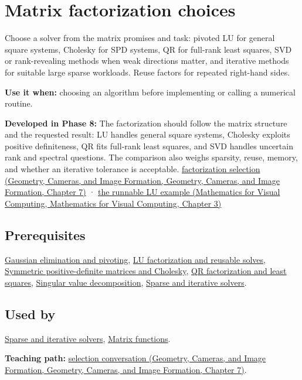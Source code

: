 \hypertarget{appendix-221a483bec2d}{}\label{referencestart:appendix-221a483bec2d}
\section{Matrix factorization choices}\label{appendix-221a483bec2d-matrix-factorization-choices}

Choose a solver from the matrix promises and task: pivoted LU for general square systems, Cholesky for SPD systems, QR for full-rank least squares, SVD or rank-revealing methods when weak directions matter, and iterative methods for suitable large sparse workloads. Reuse factors for repeated right-hand sides.

\textbf{Use it when:} choosing an algorithm before implementing or calling a numerical routine.

\textbf{Developed in Phase 8:} The factorization should follow the matrix structure and the requested result: LU handles general square systems, Cholesky exploits positive definiteness, QR fits full-rank least squares, and SVD handles uncertain rank and spectral questions. The comparison also weighs sparsity, reuse, memory, and whether an iterative tolerance is acceptable. \href{../03-Geometry-Cameras-and-Image-Formation/main.pdf\#nameddest=02-foundations-ii-ch038-choose-a-factorization-from-structure-and-the-requested-answer}{factorization selection (Geometry, Cameras, and Image Formation, Geometry, Cameras, and Image Formation, Chapter 7)} · \href{../02-Mathematics-for-Visual-Computing/main.pdf\#nameddest=01-foundations-i-ch019-a-runnable-pivoted-lu-reference-preserves-the-elimination-history}{the runnable LU example (Mathematics for Visual Computing, Mathematics for Visual Computing, Chapter 3)}

\subsection{Prerequisites}\label{appendix-221a483bec2d-prerequisites}

\hyperref[appendix-f6e77f4a200f]{Gaussian elimination and pivoting}, \hyperref[appendix-55e4b5b0a1e6]{LU factorization and reusable solves}, \hyperref[appendix-50d2ea3c9b26]{Symmetric positive-definite matrices and Cholesky}, \hyperref[appendix-c3421e6b4f2c]{QR factorization and least squares}, \hyperref[appendix-1fad5e7f36fa]{Singular value decomposition}, \hyperref[appendix-67c87a3d9e94]{Sparse and iterative solvers}.

\subsection{Used by}\label{appendix-221a483bec2d-used-by}

\hyperref[appendix-67c87a3d9e94]{Sparse and iterative solvers}, \hyperref[appendix-0f4bc2bf2b1f]{Matrix functions}.

\textbf{Teaching path:} \href{../03-Geometry-Cameras-and-Image-Formation/main.pdf\#nameddest=02-foundations-ii-ch038-close-the-journey-with-an-algorithm-selection-conversation}{selection conversation (Geometry, Cameras, and Image Formation, Geometry, Cameras, and Image Formation, Chapter 7)}.
